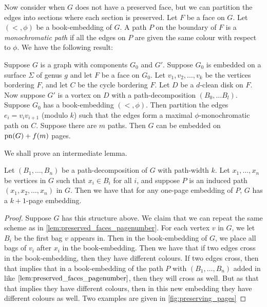 Now consider when \(G\) does not have a preserved face, but we can partition the edges into sections where each section is preserved. Let \(F\) be a face on \(G\). Let \( (<, \phi) \) be a book-embedding of \(G\). A path \(P\) on the boundary of \(F\) is a \textit{monochromatic path} if all the edges on \(P\) are given the same colour with respect to \( \phi \). We have the following result:
\begin{lemma}\label{lem:vortices_mono_paths}
	Suppose \(G\) is a graph with components \(G_0\) and \(G'\). Suppose \(G_0\) is embedded on a surface \(\Sigma \) of genus \(g\) and let \(F\) be a face on \(G_0\). Let \(v_1, v_2, \ldots, v_k\) be the vertices bordering \(F\), and let \(C\) be the cycle bordering \(F\). Let \(D\) be a \(d\)-clean disk on \(F\). Now suppose \(G'\) is a vortex on \(D\) with a path-decomposition \((B_0, \ldots B_l)\). Suppose \(G_0\) has a book-embedding \((<, \phi)\). Then partition the edges \(e_i = v_i v_{i + 1}\) (modulo \(k\)) such that the edges form a maximal \(\phi \)-monochromatic path on \(C\). Suppose there are \(m\) paths. Then \(G\) can be embedded on \(\operatorname{pn}(G) + f(m)\) pages.
\end{lemma}
We shall prove an intermediate lemma. 
\begin{lemma}\label{lem:one_page_decomposition}
	Let \((B_1, \ldots, B_n)\) be a path-decomposition of \(G\) with path-width \(k\). Let \(x_1, \ldots, x_n\) be vertices in \(G\) such that \(x_i \in B_i\) for all \(i\), and suppose \(P\) is an induced path \((x_1, x_2, \ldots, x_n)\) in \(G\). Then we have that for any one-page embedding of \(P\), \(G\) has a \(k + 1\)-page embedding. 
\end{lemma}
\begin{proof}
	Suppose \(G\) has this structure above.
	We claim that we can repeat the same scheme as in \cref{lem:preserved_faces_pagenumber}. For each vertex \(v\) in \(G\), we let \(B_i\) be the first bag \(v\) appears in. Then in the book-embedding of \(G\), we place all bags of \(v_i\) after \(x_i\) in the book-embedding. Then we have that if two edges cross in the book-embedding, then they have different colours. If two edges cross, then that implies that in a book-embedding of the path \(P\) with \((B_1, \ldots, B_n)\) added in like \(\cref{lem:preserved_faces_pagenumber}\), then they will cross as well. But as that that implies they have different colours, then in this new embedding they have different colours as well. Two examples are given in \cref{fig:preserving_pages}
\end{proof}


